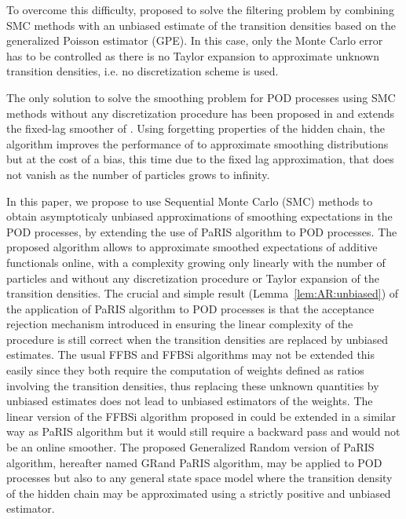 \documentclass[12pt]{article}
\newcommand{\1}{\mathrm{1}}
\begin{document}
To overcome this difficulty, \cite{fearnhead:papaspiliopoulos:roberts:2008} proposed to solve the filtering problem by combining SMC methods with an unbiased estimate of the transition densities based on the generalized Poisson estimator (GPE). 
     In this case, only the Monte Carlo error has to be controlled as there is no Taylor expansion to approximate unknown transition densities, i.e. no discretization scheme is used.
 
 The only solution to solve the smoothing problem for POD processes using SMC methods without any discretization procedure has been proposed in \cite{olsson:strojby:2011} and extends the fixed-lag smoother of \cite{olsson:cappe:douc:moulines:2008}. 
 Using forgetting properties of the hidden chain, the algorithm improves the performance of \cite{fearnhead:papaspiliopoulos:roberts:2008} to approximate smoothing distributions but at the cost of a bias, this time due to the fixed lag approximation, that does not vanish as the number of particles grows to infinity.
 
In this paper, we propose to use Sequential Monte Carlo (SMC) methods to obtain asymptoticaly unbiased approximations of smoothing expectations in the POD processes, by extending the use of  PaRIS algorithm to POD processes.
The proposed algorithm allows to approximate smoothed expectations of additive functionals online, with a complexity growing only linearly with the number of particles and without any discretization procedure or Taylor expansion of the transition densities.
 The crucial and simple result (Lemma~\ref{lem:AR:unbiased}) of the application of PaRIS algorithm to POD processes is that the acceptance rejection mechanism introduced in \cite{douc:garivier:moulines:olsson:2011} ensuring the linear complexity of the procedure is still correct when the transition densities are replaced by unbiased estimates. 
 The usual FFBS and FFBSi algorithms may not be extended this easily since they both require the computation of weights defined as ratios involving the transition densities, thus replacing these unknown quantities by unbiased estimates does not lead to unbiased estimators of the weights. 
 The linear version of the FFBSi algorithm proposed in \cite{douc:garivier:moulines:olsson:2011} could be extended in a similar way as PaRIS algorithm but it would still require a backward pass and would not be an online smoother. 
 The proposed Generalized Random version of PaRIS algorithm, hereafter named GRand PaRIS algorithm, may be applied to POD processes but also to any general state space model where the transition density of the hidden chain may be approximated using a strictly positive and unbiased estimator.
\end{document}
